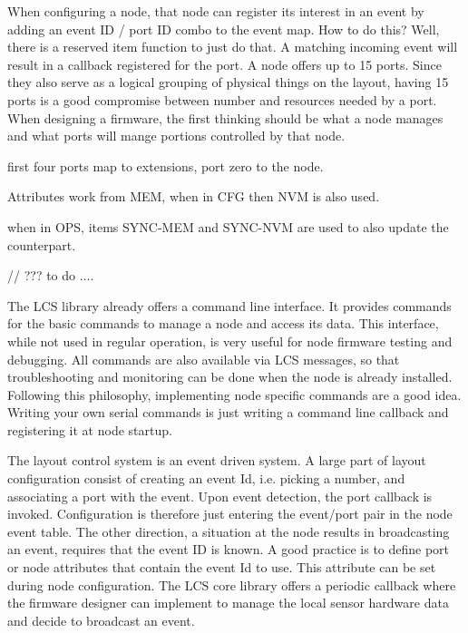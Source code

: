 When configuring a node, that node can register its interest in an event by adding an event ID / port ID combo to the event map. How to do this? Well, there is a reserved item function to just do that. A matching incoming event will result in a callback registered for the port. A node offers up to 15 ports. Since they also serve as a logical grouping of physical things on the layout, having 15 ports is a good compromise between number and resources needed by a port. When designing a firmware, the first thinking should be what a node manages and what ports will mange portions controlled by that node.

first four ports map to extensions, port zero to the node.

Attributes work from MEM, when in CFG then NVM is also used.

when in OPS, items SYNC-MEM and SYNC-NVM are used to also update the counterpart.


// ??? to do ....



The LCS library already offers a command line interface. It provides commands for the basic commands to manage a node and access its data. This interface, while not used in regular operation, is very useful for node firmware testing and debugging. All commands are also available via LCS messages, so that troubleshooting and monitoring can be done when the node is already installed. Following this philosophy, implementing node specific commands are a good idea. Writing your own serial commands is just writing a command line callback and registering it at node startup.


The layout control system is an event driven system. A large part of layout configuration consist of creating an event Id, i.e. picking a number, and associating a port with the event. Upon event detection, the port callback is invoked. Configuration is therefore just entering the event/port pair in the node event table. The other direction, a situation at the node results in broadcasting an event, requires that the event ID is known. A good practice is to define port or node attributes that contain the event Id to use. This attribute can be set during node configuration. The LCS core library offers a periodic callback where the firmware designer can implement to manage the local sensor hardware data and decide to broadcast an event.

